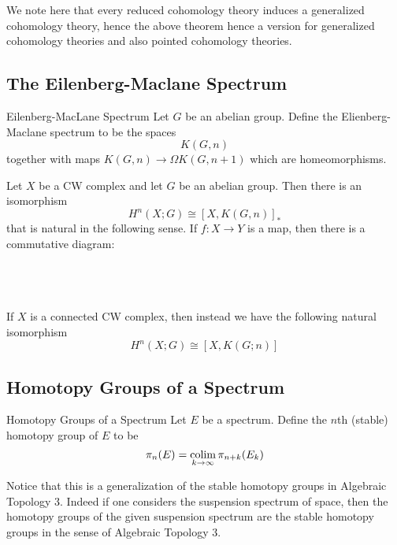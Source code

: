 \documentclass[a4paper]{article}
\begin{document}
We note here that every reduced cohomology theory induces a generalized cohomology theory, hence the above theorem hence a version for generalized cohomology theories and also pointed cohomology theories. 

\subsection{The Eilenberg-Maclane Spectrum}
\begin{defn}{Eilenberg-MacLane Spectrum}{} Let $G$ be an abelian group. Define the Elienberg-Maclane spectrum to be the spaces $$K(G,n)$$ together with maps $K(G,n)\to\Omega K(G,n+1)$ which are homeomorphisms. 
\end{defn}

\begin{thm}{}{} Let $X$ be a CW complex and let $G$ be an abelian group. Then there is an isomorphism $$H^n(X;G)\cong[X,K(G,n)]_\ast$$ that is natural in the following sense. If $f:X\to Y$ is a map, then there is a commutative diagram: \\~\\
\\~\\
\end{thm}

If $X$ is a connected CW complex, then instead we have the following natural isomorphism $$H^n(X;G)\cong[X,K(G;n)]$$

\subsection{Homotopy Groups of a Spectrum}
\begin{defn}{Homotopy Groups of a Spectrum}{} Let $E$ be a spectrum. Define the $n$th (stable) homotopy group of $E$ to be $$\pi_n(E)=\operatorname*{colim}_{k\to\infty}\pi_{n+k}(E_k)$$
\end{defn}

Notice that this is a generalization of the stable homotopy groups in Algebraic Topology 3. Indeed if one considers the suspension spectrum of space, then the homotopy groups of the given suspension spectrum are the stable homotopy groups in the sense of Algebraic Topology 3. \\~\\
\end{document}
